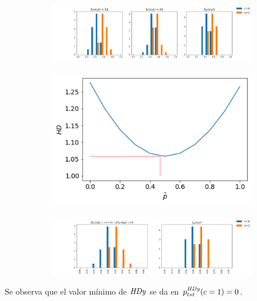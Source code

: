 \begin{figure}[h]
    \centering
    \begin{subfigure}[b]{\textwidth}
        \centering
        \includegraphics[width=\linewidth]{../plots_teoria/hdy_1.png}
    \end{subfigure}
    \begin{subfigure}[b]{0.4\textwidth}
        \centering
        \includegraphics[width=\linewidth]{../plots_teoria/hdy_2.png}
    \end{subfigure}
    \begin{subfigure}[b]{\textwidth}
        \centering
        \includegraphics[width=\linewidth]{../plots_teoria/hdy_3.png}
    \end{subfigure}
    \hfill
\end{figure}

Se observa que el valor mínimo de $\it HDy \/$ se da en $p^{\it HDy
\/}_{tst}(c=1) = 0$.

